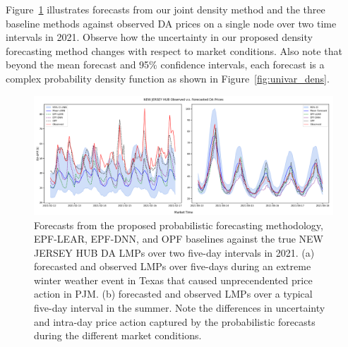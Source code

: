 Figure~\ref{fig:forecast_timeseries} illustrates forecasts from our joint density method and the three baseline methods
against observed DA prices on a single node over two time intervals in 2021.
Observe how the uncertainty in our proposed density forecasting method changes with respect to market conditions.
Also note that beyond the mean forecast and 95\% confidence intervals, each forecast is a complex probability density
function as shown in Figure~\ref{fig:univar_dens}.

\begin{figure}[htbp]
    \caption[Timeseries of observed v.s. forecast prices]{
        Forecasts from the proposed probabilistic forecasting methodology, EPF-LEAR, EPF-DNN, and OPF baselines
        against the true NEW JERSEY HUB DA LMPs over two five-day intervals in 2021.
        (a) forecasted and observed LMPs over five-days during an extreme winter weather event in Texas
        that caused unprecendented price action in PJM.
        (b) forecasted and observed LMPs over a typical five-day interval in the summer.
        Note the differences in uncertainty and intra-day price action captured by the probabilistic forecasts
        during the different market conditions.
    }
    \begin{center}
        \setlength{\fboxsep}{0pt}%
        \setlength{\fboxrule}{1pt}%
        \includegraphics[width=150mm]{figs/nj_hub_ts}
    \end{center}
    \label{fig:forecast_timeseries}
\end{figure}

